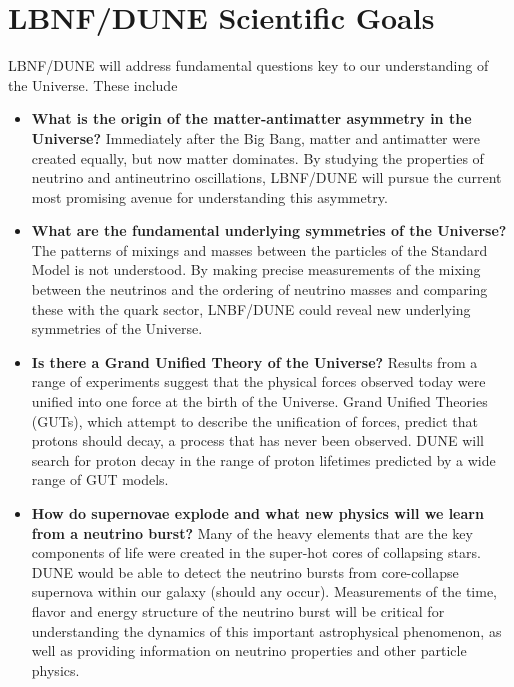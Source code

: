 \chapter{LBNF/DUNE Scientific Goals}
\label{ch:physics-goals}




LBNF/DUNE will address fundamental questions key to our understanding of the Universe. These include
\begin{itemize}
   \item {\bf What is the origin of the matter-antimatter asymmetry in the Universe?} Immediately after
                    the Big Bang, matter and antimatter were created equally, but now matter dominates.
                    By studying the properties of neutrino and antineutrino oscillations, LBNF/DUNE 
                    will pursue the current most promising avenue for understanding this asymmetry.
   \item {\bf What are the fundamental underlying symmetries of the Universe?} The patterns of mixings and masses between the particles of the Standard Model is not understood. By making precise measurements of the mixing between the neutrinos and the ordering of neutrino masses and comparing these with the quark sector, LNBF/DUNE could reveal new underlying symmetries of the Universe.
  \item{\bf  Is there a Grand Unified Theory of the Universe?} Results from a range of experiments suggest that the
                 physical forces observed today were unified into one force at the birth of the Universe.
                Grand Unified Theories (GUTs), which attempt to describe the unification of forces,
                predict that protons should decay, a process that has never been observed. DUNE will 
                search for proton decay in the range of proton lifetimes predicted by a wide range of GUT models.
   \item{\bf How do supernovae explode and what new physics will we learn from a neutrino burst?}
   Many of the heavy elements that are the key components of life were created in the super-hot cores of collapsing stars. DUNE would be able to detect the neutrino bursts from core-collapse supernova within our galaxy (should any occur). Measurements of the time, flavor and energy structure of the neutrino burst will be critical for understanding the dynamics of this important astrophysical phenomenon, as well as providing information on neutrino properties and other particle physics.
\end{itemize}

